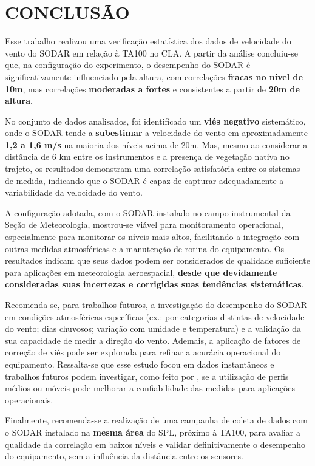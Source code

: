 \documentclass[12pt, a4paper, twocolumn]{article}
\begin{document}
\section{CONCLUSÃO}

Esse trabalho realizou uma verificação estatística dos dados de velocidade do vento do SODAR em relação à TA100 no CLA. A partir da análise concluiu-se que, na configuração do experimento, o desempenho do SODAR é significativamente influenciado pela altura, com correlações \textbf{fracas no nível de 10m}, mas correlações \textbf{moderadas a fortes} e consistentes a partir de \textbf{20m de altura}.

No conjunto de dados analisados, foi identificado um \textbf{viés negativo} sistemático, onde o SODAR tende a \textbf{subestimar} a velocidade do vento em aproximadamente \textbf{1,2 a 1,6 m/s} na maioria dos níveis acima de 20m. Mas, mesmo ao considerar a distância de 6 km entre os instrumentos e a presença de vegetação nativa no trajeto, os resultados demonstram uma correlação satisfatória entre os sistemas de medida, indicando que o SODAR é capaz de capturar adequadamente a variabilidade da velocidade do vento.

A configuração adotada, com o SODAR instalado no campo instrumental da Seção de Meteorologia, mostrou-se viável para monitoramento operacional, especialmente para monitorar os níveis mais altos, facilitando a integração com outras medidas atmosféricas e a manutenção de rotina do equipamento. Os resultados indicam que seus dados podem ser considerados de qualidade suficiente para aplicações em meteorologia aeroespacial, \textbf{desde que devidamente consideradas suas incertezas e corrigidas suas tendências sistemáticas}.

Recomenda-se, para trabalhos futuros, a investigação do desempenho do SODAR em condições atmosféricas específicas (ex.: por categorias distintas de velocidade do vento; dias chuvosos; variação com umidade e temperatura) e a validação da sua capacidade de medir a direção do vento. 
Ademais, a aplicação de fatores de correção de viés pode ser explorada para refinar a acurácia operacional do equipamento. 
Ressalta-se que esse estudo focou em dados instantâneos e trabalhos futuros podem investigar, como feito por , se a utilização de perfis médios ou móveis pode melhorar a confiabilidade das medidas para aplicações operacionais.

Finalmente, recomenda-se a realização de uma campanha de coleta de dados com o SODAR instalado na \textbf{mesma área} do SPL, próximo à TA100, para avaliar a qualidade da correlação em baixos níveis e validar definitivamente o desempenho do equipamento, sem a influência da distância entre os sensores. 


\end{document}
